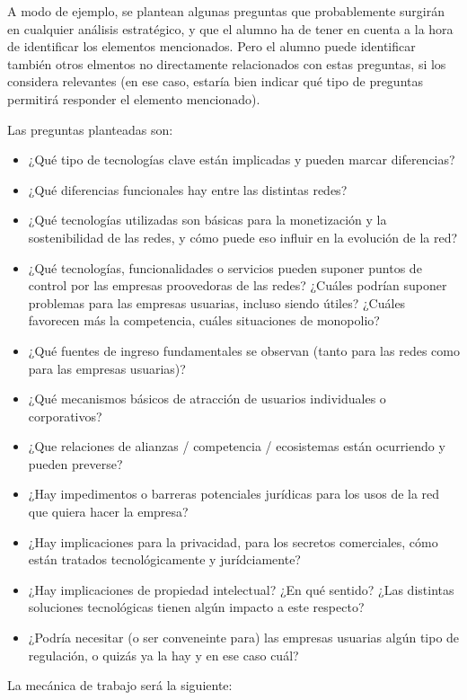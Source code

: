 \documentclass[a4paper,12pt]{article}
\begin{document}
A modo de ejemplo, se plantean algunas preguntas que probablemente surgirán en cualquier análisis estratégico, y que el alumno ha de tener en cuenta a la hora de identificar los elementos mencionados. Pero el alumno puede identificar también otros elmentos no directamente relacionados con estas preguntas, si los considera relevantes (en ese caso, estaría bien indicar qué tipo de preguntas permitirá responder el elemento mencionado).

Las preguntas planteadas son:

\begin{itemize}
\item ¿Qué tipo de tecnologías clave están implicadas y pueden marcar diferencias?
\item ¿Qué diferencias funcionales hay entre las distintas redes?
\item ¿Qué tecnologías utilizadas son básicas para la monetización y la
sostenibilidad de las redes, y cómo puede eso influir en la evolución de la red?
\item ¿Qué tecnologías, funcionalidades o servicios pueden suponer puntos
de control por las empresas proovedoras de las redes? ¿Cuáles podrían suponer
problemas para las empresas usuarias, incluso siendo útiles? ¿Cuáles favorecen
más la competencia, cuáles situaciones de monopolio?
\item ¿Qué fuentes de ingreso fundamentales se observan (tanto para las redes como para las empresas usuarias)?
\item ¿Qué mecanismos básicos de atracción de usuarios individuales o corporativos?
\item ¿Que relaciones de alianzas / competencia / ecosistemas están
ocurriendo y pueden preverse?
\item ¿Hay impedimentos o barreras potenciales jurídicas para los usos de la red que quiera hacer la empresa?
\item ¿Hay implicaciones para la privacidad, para los secretos comerciales, cómo están tratados tecnológicamente y jurídciamente?
\item ¿Hay implicaciones de propiedad intelectual? ¿En qué sentido? ¿Las
distintas soluciones tecnológicas tienen algún impacto a este respecto?
\item ¿Podría necesitar (o ser conveneinte para) las empresas usuarias algún tipo de regulación, o quizás ya la hay y en ese caso cuál?
\end{itemize}

La mecánica de trabajo será la siguiente:
\end{document}
